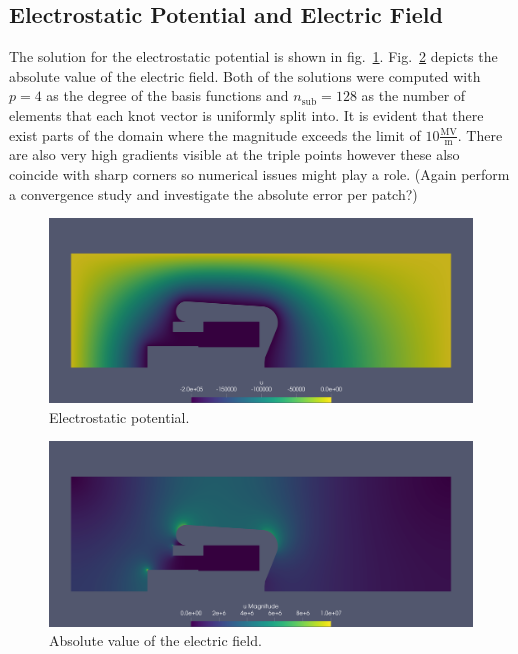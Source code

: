 \subsection{Electrostatic Potential and Electric Field}
The solution for the electrostatic potential is shown in fig.~\ref{fig:200kV_potential}. Fig.~\ref{fig:200kV_electric_field} depicts the absolute value of the electric field.
Both of the solutions were computed with $p=4$ as the degree of the basis functions and $n_\mathrm{sub}=128$ as the number of elements that each knot vector is uniformly split into.
It is evident that there exist parts of the domain where the magnitude exceeds the limit of $10 \frac{\mathrm{MV}}{\mathrm{m}}$. There are also very high gradients visible at the triple points however these also coincide with sharp corners so numerical issues might play a role. (Again perform a convergence study and investigate the absolute error per patch?)

\begin{center}
\begin{figure}[H]
  \includegraphics[width=\textwidth]{figures/200kV/potential}
  \caption{Electrostatic potential.}
  \label{fig:200kV_potential}
\end{figure}
\end{center}

\begin{center}
\begin{figure}[H]
  \includegraphics[width=\textwidth]{figures/200kV/gradient}
  \caption{Absolute value of the electric field.}
  \label{fig:200kV_electric_field}
\end{figure}
\end{center}

